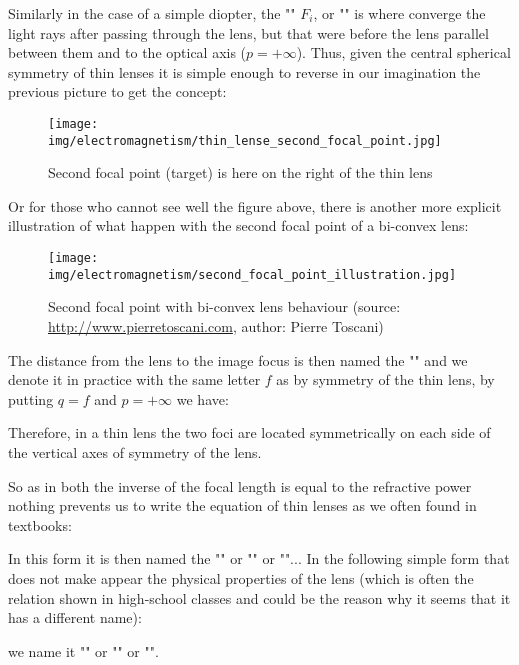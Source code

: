 	Similarly in the case of a simple diopter, the "" $F_i$, or "" is where converge the light rays after passing through the lens, but that were before the lens parallel between them and to the optical axis ($p=+\infty$). Thus, given the central spherical symmetry of thin lenses it is simple enough to reverse in our imagination the previous picture to get the concept:
	\begin{figure}[H]
		\centering
		\texttt{[image: img/electromagnetism/thin\_lense\_second\_focal\_point.jpg]}
		\caption{Second focal point (target) is here on the right of the thin lens}
	\end{figure}
	Or for those who cannot see well the figure above, there is another more explicit illustration of what happen with the second focal point of a bi-convex lens:
	\begin{figure}[H]
		\centering
		\texttt{[image: img/electromagnetism/second\_focal\_point\_illustration.jpg]}
		\caption[Second focal point with bi-convex lens behaviour]{Second focal point with bi-convex lens behaviour (source: \url{http://www.pierretoscani.com}, author: Pierre Toscani)}
	\end{figure}
	The distance from the lens to the image focus is then named the "" and we denote it in practice with the same letter $f$ as by symmetry of the thin lens, by putting $q=f$ and $p=+\infty$ we have:
	
	Therefore, in a thin lens the two foci are located symmetrically on each side of the vertical axes of symmetry of the lens.

	So as in both the inverse of the focal length is equal to the refractive power nothing prevents us to write the equation of thin lenses as we often found in textbooks:
	
	In this form it is then named the "" or "" or ""... In the following simple form that does not make appear the physical properties of the lens (which is often the relation shown in high-school classes and could be the reason why it seems that it has a different name):
	
	we name it "" or "" or "".

